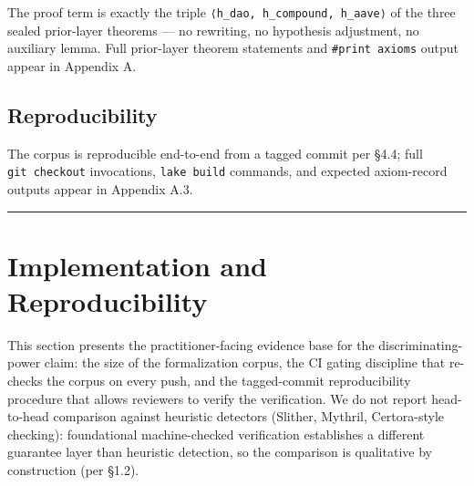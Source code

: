 \begin{Shaded}
\begin{Highlighting}[]
\end{Highlighting}
\end{Shaded}

The proof term is exactly the triple
\texttt{⟨h\_dao,\ h\_compound,\ h\_aave⟩} of the three sealed
prior-layer theorems --- no rewriting, no hypothesis adjustment, no
auxiliary lemma. Full prior-layer theorem statements and
\texttt{\#print\ axioms} output appear in Appendix A.

\subsection{Reproducibility}\label{reproducibility}

The corpus is reproducible end-to-end from a tagged commit per §4.4;
full \texttt{git\ checkout} invocations, \texttt{lake\ build} commands,
and expected axiom-record outputs appear in Appendix A.3.

\begin{center}\rule{0.5\linewidth}{0.5pt}\end{center}

\section{Implementation and
Reproducibility}\label{implementation-and-reproducibility}

This section presents the practitioner-facing evidence base for the
discriminating-power claim: the size of the formalization corpus, the CI
gating discipline that re-checks the corpus on every push, and the
tagged-commit reproducibility procedure that allows reviewers to verify
the verification. We do not report head-to-head comparison against
heuristic detectors (Slither, Mythril, Certora-style checking):
foundational machine-checked verification establishes a different
guarantee layer than heuristic detection, so the comparison is
qualitative by construction (per §1.2).

